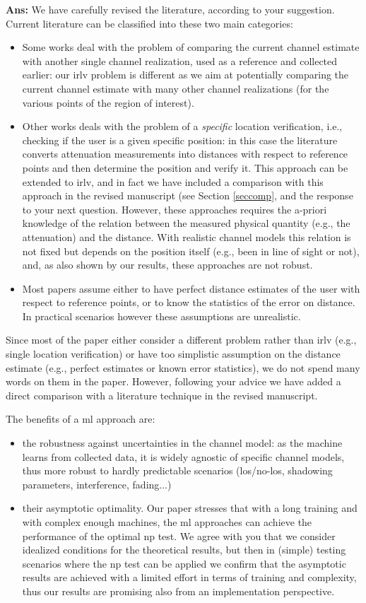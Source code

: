 \documentclass[draftcls,onecolumn,12pt]{IEEEtran}
\begin{document}
{
{\bf Ans:} We have carefully revised the literature, according to your suggestion. Current literature can be classified into these two main categories:
\begin{itemize}
    \item Some works deal with the problem of comparing the current channel estimate with another single channel realization, used as a reference and collected earlier: our \ac{irlv} problem   is different as we aim at potentially comparing the current channel estimate with many other channel realizations (for the various points of the region of interest). 
    \item Other works deals with the problem of a {\em specific} location verification, i.e., checking if the user is a given specific position: in this case the literature converts attenuation measurements into distances with respect to reference points and then determine the position and verify it. This approach can be extended to \ac{irlv}, and in fact we have included a comparison with this approach in the revised manuscript (see  Section \ref{seccomp}, and the response to your next question. However, these approaches requires the a-priori knowledge of the relation between the measured physical quantity (e.g., the attenuation) and the distance. With realistic channel models this relation is not fixed but depends on the position itself (e.g., been in line of sight or not), and, as also shown by our results, these approaches are not robust.
    \item Most papers assume either to have perfect distance estimates of the user with respect to reference points, or to know the statistics of the error on distance. In practical scenarios however these assumptions are unrealistic.
\end{itemize}
Since most of the paper either consider a different problem rather than \ac{irlv} (e.g., single location verification) or have too simplistic assumption on the distance estimate (e.g., perfect estimates or known error statistics), we do not spend many words on them in the paper. However, following your advice we have added a direct comparison with a literature technique in the revised manuscript.

The benefits of a \ac{ml} approach are:
\begin{itemize}
    \item the robustness against uncertainties in the channel model: as the machine learns from collected data, it is widely agnostic of specific channel models, thus more robust to hardly predictable scenarios (los/no-los, shadowing parameters, interference, fading...)
    \item their asymptotic optimality. Our paper stresses that with a long training and with complex enough machines, the \ac{ml} approaches can achieve the performance of the optimal \ac{np} test. We agree with you that we consider idealized conditions for the theoretical results, but then in (simple) testing scenarios where the \ac{np} test can be applied we confirm that the asymptotic results are achieved with a limited effort in terms of training and complexity, thus our results are promising also from an implementation perspective.
\end{itemize}

}
\end{document}

